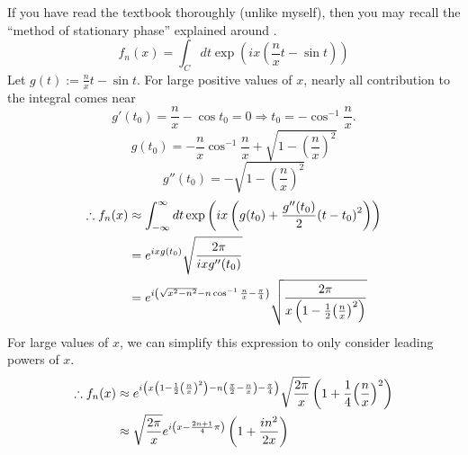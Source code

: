 \item

If you have read the textbook thoroughly (unlike myself),
then you may recall the ``method of stationary phase'' explained around .
\[
    f_n(x) = \int_C dt \exp\left( ix \left( \frac{n}{x} t - \sin t \right) \right)
\]
Let $g(t) := \frac{n}{x} t - \sin t$.
For large positive values of $x$, nearly all contribution to the integral comes near
\[
    g'(t_0) = \frac{n}{x} - \cos t_0 = 0
    \Rightarrow t_0 = -\cos^{-1} \frac{n}{x}.
\]
\[
    g(t_0) = -\frac{n}{x} \cos^{-1} \frac{n}{x} + \sqrt{1 - {\left( \frac{n}{x} \right)}^2}
\]
\[
    g''(t_0) = -\sqrt{1 - {\left( \frac{n}{x} \right)}^2}
\]
\begin{align*}
    \therefore f_n(x)
    &\approx \int_{-\infty}^\infty dt \exp\left(
        ix \left( g(t_0) + \frac{g''(t_0)}{2} {(t - t_0)}^2 \right)
    \right) \\
    &= e^{ixg(t_0)} \sqrt{\frac{2\pi}{ixg''(t_0)}} \\
    &= e^{i\left( \sqrt{x^2 - n^2} - n \cos^{-1} \frac{n}{x} - \frac{\pi}{4} \right)}
     \sqrt{\frac{2\pi}{x\left( 1 - \frac{1}{2} {\left(\frac{n}{x} \right)}^2 \right)}}
\end{align*}
For large values of $x$, we can simplify this expression to only consider leading powers of $x$.
\begin{align*}
    \therefore f_n(x)
    &\approx e^{i\left( x \left( 1 - \frac{1}{2} {\left(\frac{n}{x} \right)}^2 \right) - n \left( \frac{\pi}{2} - \frac{n}{x} \right) - \frac{\pi}{4} \right)}
     \sqrt{\frac{2\pi}{x}} \left( 1 + \frac{1}{4} {\left( \frac{n}{x} \right)}^2 \right) \\
    &\approx \sqrt{\frac{2\pi}{x}} e^{i\left( x - \frac{2n + 1}{4} \pi \right)} \left( 1 + \frac{in^2}{2x} \right)
\end{align*}